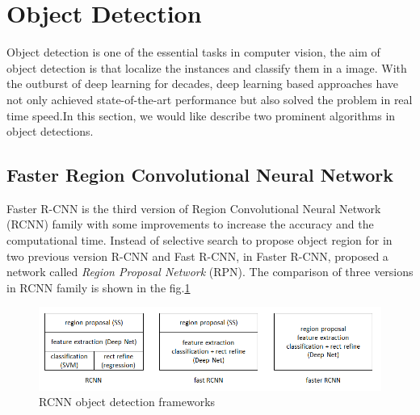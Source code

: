 \section{Object Detection}
\hspace{0.5cm}Object detection is one of the essential tasks in computer vision, the aim of object detection is that localize the instances and classify them in a
image. With the outburst of deep learning for decades, deep learning based approaches have not only achieved state-of-the-art performance but also
solved the problem in real time speed.In this section, we would like describe two prominent algorithms in object detections.
\subsection{Faster Region Convolutional Neural Network}
\hspace{0.5cm}Faster R-CNN is the third version of Region Convolutional Neural Network (RCNN) family with some
improvements to increase the accuracy and the computational time. Instead of selective search to propose object region
for in two previous version R-CNN and Fast R-CNN, in Faster R-CNN, \cite{FrRCNN} proposed a network called \textit{Region Proposal Network} (RPN). The comparison of three versions in RCNN
family is shown in the fig.\ref{fig:rcnn_family}
\begin{figure}[h!]
    \centering
    \includegraphics[width=\textwidth]{Chapters/Fig/rcnn-family.png}
    \caption{RCNN object detection frameworks}
    \label{fig:rcnn_family}
\end{figure}
